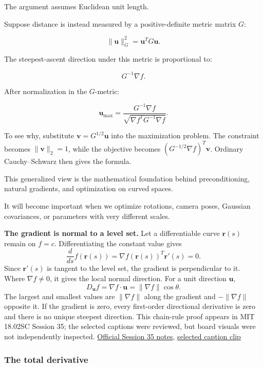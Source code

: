 The argument assumes Euclidean unit length.

Suppose distance is instead measured by a positive-definite metric matrix \(G\):

\[
\|\mathbf u\|_G^2=\mathbf u^TG\mathbf u.
\]

The steepest-ascent direction under this metric is proportional to:

\[
G^{-1}\nabla f.
\]

After normalization in the \(G\)-metric:

\[
\mathbf u_{\max} = \frac{G^{-1}\nabla f} {\sqrt{\nabla f^TG^{-1}\nabla f}}.
\]

To see why, substitute \(\mathbf v=G^{1/2}\mathbf u\) into the maximization problem. The constraint becomes \(\|\mathbf v\|_2=1\), while the objective becomes \((G^{-1/2}\nabla f)^T\mathbf v\). Ordinary Cauchy--Schwarz then gives the formula.

This generalized view is the mathematical foundation behind preconditioning, natural gradients, and optimization on curved spaces.

It will become important when we optimize rotations, camera poses, Gaussian covariances, or parameters with very different scales.

\textbf{The gradient is normal to a level set.} Let a differentiable curve \(\mathbf r(s)\) remain on \(f=c\). Differentiating the constant value gives \[
\frac{d}{ds}f(\mathbf r(s))=\nabla f(\mathbf r(s))^T\mathbf r'(s)=0.
\] Since \(\mathbf r'(s)\) is tangent to the level set, the gradient is perpendicular to it. Where \(\nabla f\ne0\), it gives the local normal direction. For a unit direction \(\mathbf u\), \[
D_{\mathbf u}f=\nabla f\cdot\mathbf u=\|\nabla f\|\cos\theta.
\] The largest and smallest values are \(\|\nabla f\|\) along the gradient and \(-\|\nabla f\|\) opposite it. If the gradient is zero, every first-order directional derivative is zero and there is no unique steepest direction. This chain-rule proof appears in MIT 18.02SC Session 35; the selected captions were reviewed, but board visuals were not independently inspected. \href{https://ocw.mit.edu/courses/18-02sc-multivariable-calculus-fall-2010/6d4f46e89733b7291f86a22882aa2311_MIT18_02SC_notes_18.pdf}{Official Session 35 notes}, \href{https://www.youtube.com/watch?v=2XraaWefBd8}{selected caption clip}

\subsubsection{The total derivative}\label{02-foundations-ii-ch021-the-total-derivative}


